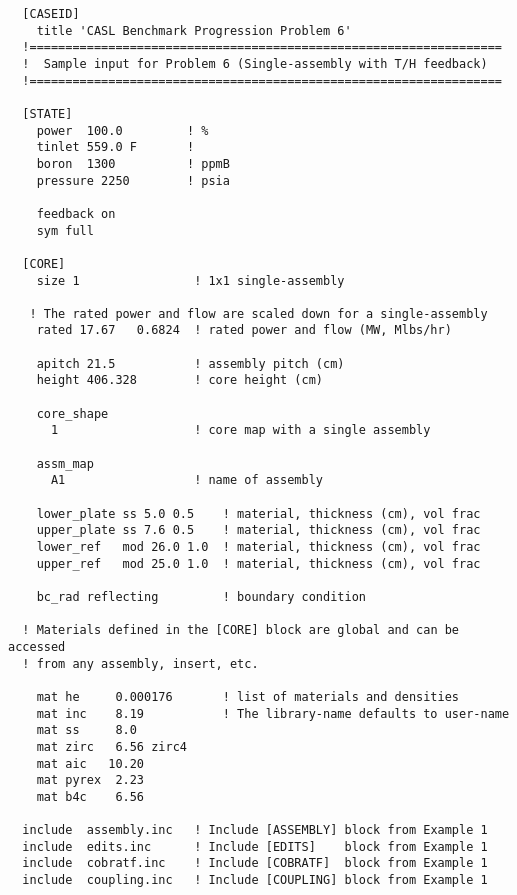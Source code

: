%
%
%
\begin{verbatim}
  [CASEID]
    title 'CASL Benchmark Progression Problem 6'
  !==================================================================
  !  Sample input for Problem 6 (Single-assembly with T/H feedback)
  !==================================================================

  [STATE]
    power  100.0         ! %
    tinlet 559.0 F       !
    boron  1300          ! ppmB
    pressure 2250        ! psia

    feedback on
    sym full

  [CORE]
    size 1                ! 1x1 single-assembly

   ! The rated power and flow are scaled down for a single-assembly
    rated 17.67   0.6824  ! rated power and flow (MW, Mlbs/hr)

    apitch 21.5           ! assembly pitch (cm)
    height 406.328        ! core height (cm)

    core_shape
      1                   ! core map with a single assembly

    assm_map
      A1                  ! name of assembly

    lower_plate ss 5.0 0.5    ! material, thickness (cm), vol frac
    upper_plate ss 7.6 0.5    ! material, thickness (cm), vol frac
    lower_ref   mod 26.0 1.0  ! material, thickness (cm), vol frac
    upper_ref   mod 25.0 1.0  ! material, thickness (cm), vol frac

    bc_rad reflecting         ! boundary condition

  ! Materials defined in the [CORE] block are global and can be accessed
  ! from any assembly, insert, etc.

    mat he     0.000176       ! list of materials and densities
    mat inc    8.19           ! The library-name defaults to user-name
    mat ss     8.0
    mat zirc   6.56 zirc4
    mat aic   10.20
    mat pyrex  2.23
    mat b4c    6.56

  include  assembly.inc   ! Include [ASSEMBLY] block from Example 1
  include  edits.inc      ! Include [EDITS]    block from Example 1
  include  cobratf.inc    ! Include [COBRATF]  block from Example 1
  include  coupling.inc   ! Include [COUPLING] block from Example 1
\end{verbatim}

